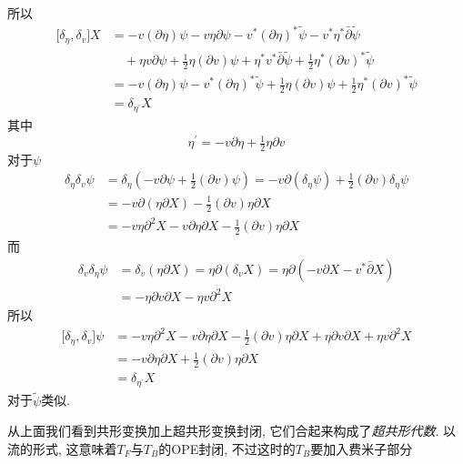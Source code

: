 \begin{tcolorbox}
所以\begin{align*}
\lbrack \delta _{\eta },\delta _{v}]X &=-v(\partial \eta )\psi -v\eta
\partial \psi -v^{\ast }(\partial \eta )^{\ast }\tilde{\psi}-v^{\ast }\eta
^{\ast }\bar{\partial}\tilde{\psi} \\
&\quad+\eta v\partial \psi +\tfrac{1}{2}\eta \left( \partial v\right) \psi +\eta
^{\ast }v^{\ast }\bar{\partial}\tilde{\psi}+\tfrac{1}{2}\eta ^{\ast }\left(
\partial v\right) ^{\ast }\tilde{\psi} \\
&=-v(\partial \eta )\psi -v^{\ast }(\partial \eta )^{\ast }\tilde{\psi}+%
\tfrac{1}{2}\eta \left( \partial v\right) \psi +\tfrac{1}{2}\eta ^{\ast
}\left( \partial v\right) ^{\ast }\tilde{\psi} \\
&=\delta _{\eta ^{\prime }}X
\end{align*}%
其中\[
\eta ^{\prime }=-v\partial \eta +\tfrac{1}{2}\eta \partial v
\]%
对于$\psi $%
\begin{align*}
\delta _{\eta }\delta _{v}\psi  &=\delta _{\eta }\left( -v\partial \psi +%
\tfrac{1}{2}(\partial v)\psi \right) =-v\partial \left( \delta _{\eta }\psi
\right) +\tfrac{1}{2}(\partial v)\delta _{\eta }\psi  \\
&=-v\partial \left( \eta \partial X\right) -\frac{1}{2}(\partial v)\eta
\partial X \\
&=-v\eta \partial ^{2}X-v\partial \eta \partial X-\tfrac{1}{2}(\partial
v)\eta \partial X
\end{align*}%
而\begin{align*}
\delta _{v}\delta _{\eta }\psi  &=\delta _{v}(\eta \partial X)=\eta
\partial (\delta _{v}X)=\eta \partial (-v\partial X-v^{\ast }\bar{\partial}X)
\\
&=-\eta \partial v\partial X-\eta v\partial ^{2}X
\end{align*}%
所以\begin{align*}
\lbrack \delta _{\eta },\delta _{v}]\psi  &=-v\eta \partial ^{2}X-v\partial
\eta \partial X-\tfrac{1}{2}(\partial v)\eta \partial X+\eta \partial
v\partial X+\eta v\partial ^{2}X \\
&=-v\partial \eta \partial X+\tfrac{1}{2}(\partial v)\eta \partial X \\
&=\delta _{\eta ^{\prime }}X
\end{align*}%
对于$\tilde{\psi}$类似.
\end{tcolorbox}
从上面我们看到共形变换加上超共形变换封闭, 它们合起来构成了{\emph{超共形代数}}. 以流的形式, 这意味着$T_{F}$与$T_{B}$的OPE封闭, 不过这时的$T_{B}$要加入费米子部分
